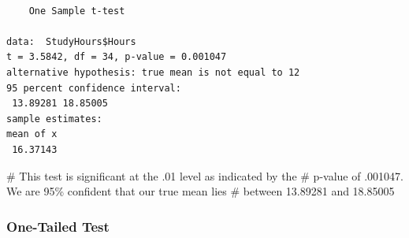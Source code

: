 \documentclass[
  letterpaper,
  DIV=11,
  numbers=noendperiod]{scrreprt}
\newenvironment{Shaded}{\begin{snugshade}}{\end{snugshade}}
\newcommand{\AttributeTok}[1]{\textcolor[rgb]{0.40,0.45,0.13}{#1}}
\newcommand{\CommentTok}[1]{\textcolor[rgb]{0.37,0.37,0.37}{#1}}
\newcommand{\DecValTok}[1]{\textcolor[rgb]{0.68,0.00,0.00}{#1}}
\newcommand{\FunctionTok}[1]{\textcolor[rgb]{0.28,0.35,0.67}{#1}}
\newcommand{\NormalTok}[1]{\textcolor[rgb]{0.00,0.23,0.31}{#1}}
\newcommand{\OtherTok}[1]{\textcolor[rgb]{0.00,0.23,0.31}{#1}}
\newcommand{\SpecialCharTok}[1]{\textcolor[rgb]{0.37,0.37,0.37}{#1}}
\newcommand{\StringTok}[1]{\textcolor[rgb]{0.13,0.47,0.30}{#1}}
\begin{document}
\begin{itemize}
\begin{Shaded}
\end{Shaded}

\begin{verbatim}

    One Sample t-test

data:  StudyHours$Hours
t = 3.5842, df = 34, p-value = 0.001047
alternative hypothesis: true mean is not equal to 12
95 percent confidence interval:
 13.89281 18.85005
sample estimates:
mean of x 
 16.37143 
\end{verbatim}

\begin{Shaded}
\begin{Highlighting}[]
\CommentTok{\# This test is significant at the .01 level as indicated by the}
\CommentTok{\# p{-}value of .001047.  We are 95\% confident that our true mean lies}
\CommentTok{\# between 13.89281 and 18.85005}
\end{Highlighting}
\end{Shaded}
\end{itemize}

\subsubsection{One-Tailed Test}\label{one-tailed-test}
\end{document}
